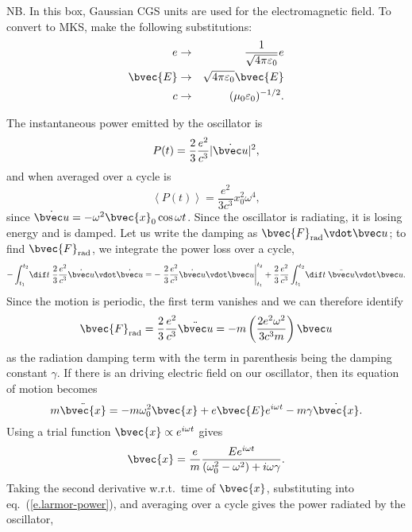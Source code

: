 \begin{sidebar}
\label{b.line-emission}
NB. In this box, Gaussian CGS units are used for the electromagnetic field. To convert to MKS, make the following substitutions:
\begin{eqnarray*}
e &\to& \frac{1}{\sqrt{4\pi\varepsilon_0}}e\\
\bvec{E} &\to& \sqrt{4\pi\varepsilon_0}\bvec{E}\\
c &\to& (\mu_0\varepsilon_0)^{-1/2}.
\end{eqnarray*}

  The instantaneous power emitted by the oscillator is
\begin{equation}\label{e.larmor-power}
	 P(t) = \frac{2}{3}\frac{e^{2}}{c^{3}} |\dot{\vu}|^{2},
\end{equation}
and when averaged over a cycle is
\begin{equation}\label{e.oscillator-power}
	 \left\langle P(t) \right\rangle = \frac{e^{2}}{3c^{3}}x_{0}^{2} \omega^{4},
\end{equation}
since $\dot{\vu} = -\omega^{2}\bvec{x}_{0}\cos \omega t$. Since the oscillator is radiating, it is losing energy and is damped. Let us write the damping as $\bvec{F}_{\mathrm{rad}}\vdot \vu$; to find $\bvec{F}_{\mathrm{rad}}$, we integrate the power loss over a cycle,
\[  -\int_{t_{1}}^{t_{2}}\!\dif t\;\frac{2}{3}\frac{e^{2}}{c^{3}}\dot{\vu}\vdot\dot{\vu} 
	= -\left.\frac{2}{3}\frac{e^{2}}{c^{3}}\dot{\vu}\vdot\vu\right|_{t_{1}}^{t_{2}} 
	+ \frac{2}{3}\frac{e^{2}}{c^{3}} \int_{t_{1}}^{t_{2}}\!\dif t\;\ddot{\vu}\vdot\vu. 
\]
Since the motion is periodic, the first term vanishes and we can therefore identify 
\[ 
	\bvec{F}_{\mathrm{rad}} = \frac{2}{3}\frac{e^{2}}{c^{3}}\ddot{\vu} 
	= -m\left(\frac{2e^{2}\omega^{2}}{3c^{3}m}\right)\vu
\]
as the radiation damping term with the term in parenthesis being the damping constant $\gamma$. 
If there is an driving electric field on our oscillator, then its equation of motion becomes
\begin{equation}\label{e.eq-sho}
	m\ddot{\bvec{x}} = -m\omega_{0}^{2}\bvec{x} + e\bvec{E}e^{i\omega t} - m\gamma \dot{\bvec{x}}.
\end{equation}
Using a trial function $\bvec{x}\propto e^{i\omega t}$ gives
\[
	\bvec{x} = \frac{e}{m}\frac{E e^{i\omega t}}{(\omega_{0}^{2}-\omega^{2}) + i\omega\gamma}.
\]
Taking the second derivative w.r.t.\ time of $\bvec{x}$, substituting into eq.~(\ref{e.larmor-power}), and averaging over a cycle gives the power radiated by the oscillator,

\end{sidebar}
